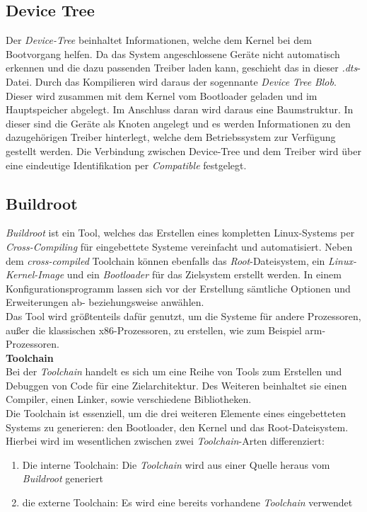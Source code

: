 \subsection{Device Tree}\label{kap:devicetree}


Der \emph{Device-Tree} beinhaltet
Informationen, welche dem Kernel bei dem Bootvorgang helfen. Da das System angeschlossene Geräte nicht automatisch erkennen
und die dazu passenden Treiber laden kann, geschieht das in dieser \emph{.dts}-Datei. Durch das Kompilieren wird daraus
der sogennante \emph{Device} \emph{Tree} \emph{Blob}. Dieser wird zusammen mit dem Kernel vom Bootloader geladen und im
Hauptspeicher abgelegt. Im Anschluss daran wird daraus eine Baumstruktur. In dieser sind die Geräte als Knoten angelegt
und es werden Informationen zu den dazugehörigen Treiber hinterlegt, welche dem Betriebssystem zur Verfügung gestellt werden.
Die Verbindung zwischen Device-Tree und dem Treiber wird über eine
eindeutige Identifikation per \emph{Compatible} festgelegt.


\subsection{Buildroot}\label{kap:buildroot}

\emph{Buildroot} ist ein Tool, welches das Erstellen eines kompletten Linux-Systems per
\emph{Cross-Compiling} für eingebettete Systeme vereinfacht und automatisiert.  Neben dem
\emph{cross-compiled} Toolchain können ebenfalls das \emph{Root}-Dateisystem, ein \emph{Linux-Kernel-Image}
und ein \emph{Bootloader} für das Zielsystem erstellt werden.  In einem Konfigurationsprogramm lassen sich vor der
Erstellung sämtliche Optionen und Erweiterungen ab- beziehungsweise anwählen. \\
Das Tool wird größtenteils dafür genutzt, um die Systeme für andere Prozessoren, außer die klassischen x86-Prozessoren,
zu erstellen, wie zum Beispiel \ac{arm}-Prozessoren.\cite{buildroot}\\

\textbf{Toolchain}\\

Bei der \emph{Toolchain} handelt es sich um eine Reihe von Tools zum Erstellen und Debuggen von Code für eine Zielarchitektur. Des Weiteren beinhaltet sie einen Compiler, einen Linker,
 sowie verschiedene Bibliotheken.\\
 Die Toolchain ist essenziell, um die drei weiteren Elemente eines eingebetteten Systems zu generieren: den Bootloader, den Kernel und das Root-Dateisystem. \\
 Hierbei wird im wesentlichen zwischen zwei \emph{Toolchain}-Arten differenziert:
 \begin{enumerate}
   \item Die interne Toolchain: Die \emph{Toolchain} wird aus einer Quelle heraus vom \emph{Buildroot} generiert
   \item die externe Toolchain: Es wird eine bereits vorhandene \emph{Toolchain} verwendet
 \end{enumerate}

